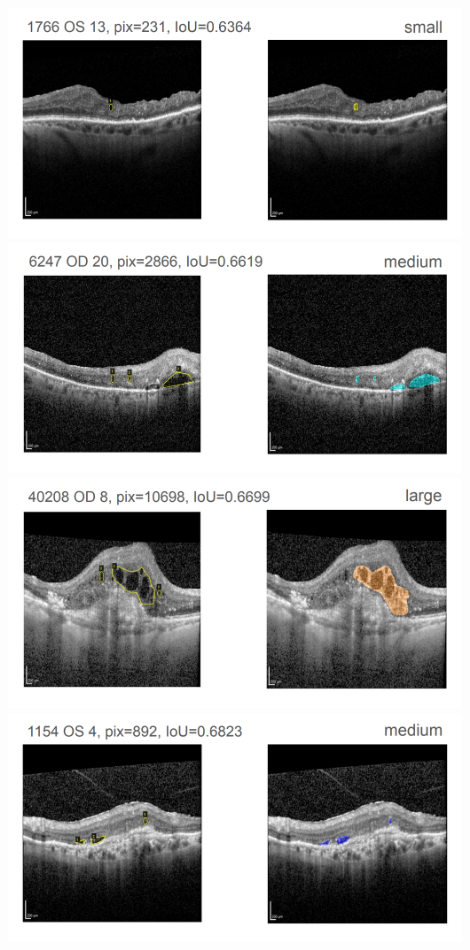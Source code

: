 \includegraphics[width=0.9\textwidth]{./pic/Segmentierung/Segmentierungsergebnisse/21.PNG}
\includegraphics[width=0.9\textwidth]{./pic/Segmentierung/Segmentierungsergebnisse/22.PNG}
\includegraphics[width=0.9\textwidth]{./pic/Segmentierung/Segmentierungsergebnisse/23.PNG}
\includegraphics[width=0.9\textwidth]{./pic/Segmentierung/Segmentierungsergebnisse/24.PNG}
